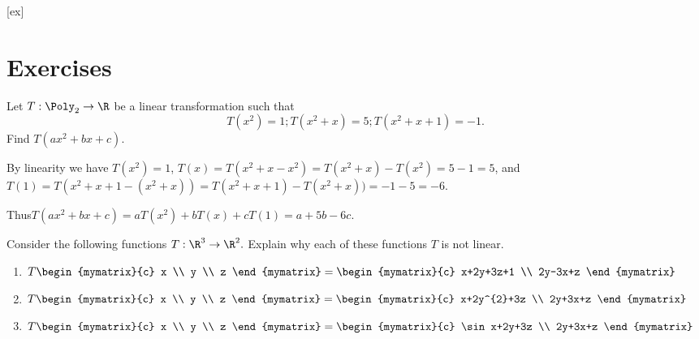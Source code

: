 [ex]
\section*{Exercises}

\begin{enumialphparenastyle}

\begin{ex} 
Let $T:\Poly_2 \to \R$ be a linear transformation such that
\[ T(x^2)=1; T(x^2+x)=5; T(x^2+x+1)=-1.\]
Find $T(ax^2+bx+c)$.
\begin{sol}
By linearity we have 
$T(x^2)=1$, $T(x) = T(x^2+x - x^2)= T(x^2+x) - T(x^2)= 5-1=5$, and 
$T(1) = T(x^2+x+1 -(x^2+x))=T(x^2+x+1) -T(x^2+x))= -1-5=-6$. 

Thus$T(ax^2+bx+c) = aT(x^2) + bT(x) + cT(1) = a+5b-6c$. 
\end{sol}
\end{ex}

\begin{ex} Consider the following functions $T:\R^{3}\rightarrow \R^{2}.$
Explain why each of these functions $T$ is not linear.

\begin{enumerate}
\item $T\begin{mymatrix}{c}
x \\
y \\
z
\end{mymatrix} =\begin{mymatrix}{c}
x+2y+3z+1 \\
2y-3x+z
\end{mymatrix} $

\item $T\begin{mymatrix}{c}
x \\
y \\
z
\end{mymatrix} =\begin{mymatrix}{c}
x+2y^{2}+3z \\
2y+3x+z
\end{mymatrix} $

\item $T\begin{mymatrix}{c}
x \\
y \\
z
\end{mymatrix} =\begin{mymatrix}{c}
\sin x+2y+3z \\
2y+3x+z
\end{mymatrix} $


\end{enumerate}
\end{ex}
\end{enumialphparenastyle}
